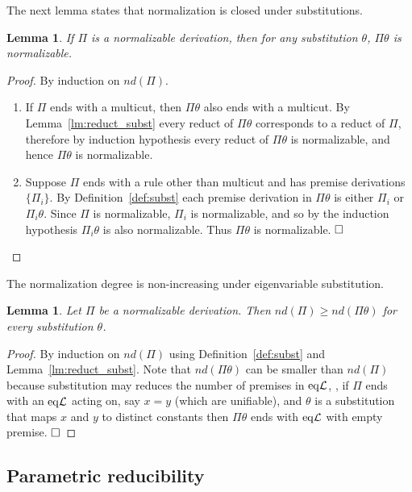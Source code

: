 \documentclass[preprint]{elsarticle}
\newcommand{\eqL}{{\rm eq}{\cal L}}
\newtheorem{lemma}[thm]{Lemma}
\def\qed{$\hfill\Box$}
\begin{document}
The next lemma states that normalization is closed under
substitutions.
\begin{lemma}
  \label{lm:subst-norm}
  If $\Pi$ is a normalizable derivation, then for any substitution
  $\theta$, $\Pi\theta$ is normalizable.
\end{lemma}
\begin{proof} By induction on $nd(\Pi)$.
  \begin{enumerate}
  \item If $\Pi$ ends with a multicut, then $\Pi\theta$ also ends with
    a multicut. By Lemma~\ref{lm:reduct_subst} every reduct of
    $\Pi\theta$ corresponds to a reduct of $\Pi$, therefore by
    induction hypothesis every reduct of $\Pi\theta$ is normalizable,
    and hence $\Pi\theta$ is normalizable.
 
  \item Suppose $\Pi$ ends with a rule other than multicut and has
    premise derivations $\{\Pi_i\}$.  By Definition~\ref{def:subst}
    each premise derivation in $\Pi\theta$ is either $\Pi_i$ or
    $\Pi_i\theta$.  Since $\Pi$ is normalizable, $\Pi_i$ is
    normalizable, and so by the induction hypothesis $\Pi_i\theta$ is
    also normalizable.  Thus $\Pi\theta$ is normalizable.  \qed
 
  \end{enumerate}
\end{proof}

The normalization degree is non-increasing under eigenvariable
substitution.

\begin{lemma}
  \label{lm:norm-degree}
  Let $\Pi$ be a normalizable derivation. Then $nd(\Pi) \geq
  nd(\Pi\theta)$ for every substitution $\theta$.
\end{lemma}
\begin{proof}
  By induction on $nd(\Pi)$ using Definition~\ref{def:subst} and
  Lemma~\ref{lm:reduct_subst}.  Note that $nd(\Pi\theta)$ can be
  smaller than $nd(\Pi)$ because substitution may reduces the number
  of premises in $\eqL$, \ie, if $\Pi$ ends with an $\eqL$ acting on,
  say $x = y$ (which are unifiable), and $\theta$ is a substitution
  that maps $x$ and $y$ to distinct constants then $\Pi\theta$ ends
  with $\eqL$ with empty premise.  \qed
\end{proof}


\subsection{Parametric reducibility}
\label{sec:red}
\end{document}
